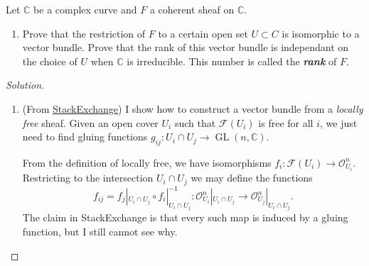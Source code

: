 \begin{manualexercise}{1.8}
	Let $\mathbb{C}$ be a complex curve and $F$ a coherent sheaf on $\mathbb{C}$.
	\begin{enumerate}[label=\alph*.]
		\item Prove that the restriction of $F$ to a certain open set $U\subset C$ is isomorphic to a vector bundle. Prove that the rank of this vector bundle is independant on the choice of $U$ when $\mathbb{C}$ is irreducible. This number is called the \textit{\textbf{rank}} of $F$.
	\end{enumerate}	
\end{manualexercise}

\begin{proof}[Solution]\leavevmode
	\begin{enumerate}[label=\alph*.]
		\item (From \href{https://math.stackexchange.com/questions/2725664/vector-bundle-locally-free-sheaf}{StackExchange}) I show how to construct a vector bundle from a \textit{locally free} sheaf. Given an open cover $U_i$ such that $\mathcal{F}(U_i)$ is free for all $i$, we just need to find gluing functions $g_{ij}:U_i\cap U_j\to \operatorname{GL}(n,\mathbb{C}) $.

		From the definition of locally free, we have isomorphisms $f_i:\mathcal{F}(U_i)\to \mathcal{O}^n_{U_i}$. Restricting to the intersection $U_i\cap U_j$ we may define the functions
	\[f_{ij}=f_j|_{U_i\cap U_j}\circ f_i|_{U_i\cap U_j}^{-1} :\mathcal{O}^n_{U_i}|_{U_i\cap U_j}\to \mathcal{O}^n_{U_j}|_{U_i\cap U_j}.\]
	The claim in StackExchange is that every such map is induced by a gluing function, but I still cannot see why.

	\iffalse\begin{remark}
		(\href{https://math.stackexchange.com/questions/2597356/vector-bundle-associated-to-a-locally-free-sheaf}{StackExchange}) The equivalence of the categories of vector bundles and locally free sheaves is given by the functor
		\[\mathcal{E}\mapsto \operatorname{Spec}(\operatorname{Sym}(\mathcal{E})),\quad E\mapsto \Gamma^\vee_{E/X^\bullet}\]
	\end{remark}\fi
	\end{enumerate}
\end{proof}

\printbibliography


